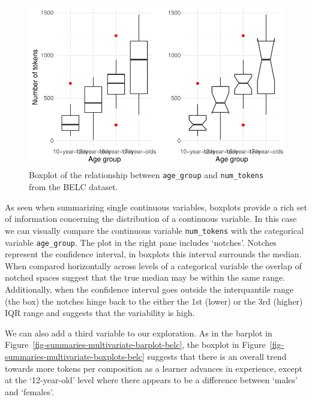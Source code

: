 \documentclass[
  letterpaper,
]{scrbook}
\begin{document}
\begin{figure}[h]

{\centering \includegraphics{./approaching-analysis_files/figure-pdf/fig-summaries-bivariate-boxplots-belc-1.pdf}

}

\caption{\label{fig-summaries-bivariate-boxplots-belc}Boxplot of the
relationship between \texttt{age\_group} and \texttt{num\_tokens} from
the BELC dataset.}

\end{figure}

As seen when summarizing single continuous variables, boxplots provide a
rich set of information concerning the distribution of a continuous
variable. In this case we can visually compare the continuous variable
\texttt{num\_tokens} with the categorical variable \texttt{age\_group}.
The plot in the right pane includes `notches'. Notches represent the
confidence interval, in boxplots this interval surrounds the median.
When compared horizontally across levels of a categorical variable the
overlap of notched spaces suggest that the true median may be within the
same range. Additionally, when the confidence interval goes outside the
interquantile range (the box) the notches hinge back to the either the
1st (lower) or the 3rd (higher) IQR range and suggests that the
variability is high.

We can also add a third variable to our exploration. As in the barplot
in Figure~\ref{fig-summaries-multivariate-barplot-belc}, the boxplot in
Figure~\ref{fig-summaries-multivariate-boxplots-belc} suggests that
there is an overall trend towards more tokens per composition as a
learner advances in experience, except at the `12-year-old' level where
there appears to be a difference between `males' and `females'.
\end{document}
